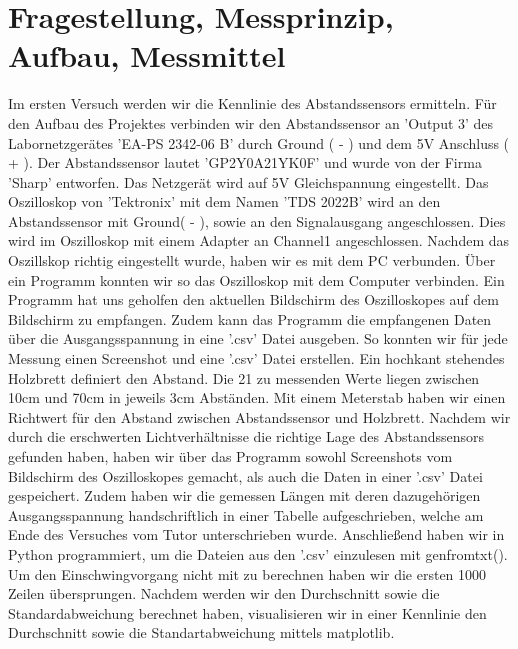 \documentclass[12pt, oneside, a4paper, \docLanguage]{report}
\begin{document}
\section{Fragestellung, Messprinzip, Aufbau, Messmittel}
\label{chap:VERSUCH_1_FRAGESTELLUNG}
Im ersten Versuch werden wir die Kennlinie des Abstandssensors ermitteln.  Für den Aufbau des Projektes verbinden wir den Abstandssensor an 'Output 3' des Labornetzgerätes 'EA-PS 2342-06 B' durch Ground ( - ) und dem 5V Anschluss ( + ).
Der Abstandssensor lautet 'GP2Y0A21YK0F' und wurde von der Firma 'Sharp' entworfen. Das Netzgerät wird auf 5V Gleichspannung eingestellt. Das Oszilloskop von 'Tektronix' mit dem Namen 'TDS 2022B' wird an den Abstandssensor mit Ground( - ), sowie an den Signalausgang angeschlossen.
Dies wird im Oszilloskop mit einem Adapter an Channel1 angeschlossen. Nachdem das Oszillskop richtig eingestellt wurde, haben wir es mit dem PC verbunden.
Über ein Programm konnten wir so das Oszilloskop mit dem Computer verbinden. Ein Programm hat uns geholfen den aktuellen Bildschirm des Oszilloskopes auf dem Bildschirm zu empfangen.
Zudem kann das Programm die empfangenen Daten über die Ausgangsspannung in eine '.csv' Datei ausgeben.
So konnten wir für jede Messung einen Screenshot und eine '.csv' Datei erstellen. 
Ein hochkant stehendes Holzbrett definiert den Abstand. Die 21 zu messenden Werte liegen zwischen 10cm und 70cm in jeweils  3cm Abständen. Mit einem Meterstab haben wir einen Richtwert für den Abstand zwischen Abstandssensor und Holzbrett. 
Nachdem wir durch die erschwerten Lichtverhältnisse die richtige Lage des Abstandssensors gefunden haben, haben wir über das Programm sowohl Screenshots vom Bildschirm des Oszilloskopes gemacht, als auch die Daten in einer '.csv' Datei gespeichert.
Zudem haben wir die gemessen Längen mit deren dazugehörigen Ausgangsspannung handschriftlich in einer Tabelle aufgeschrieben, welche am Ende des Versuches vom Tutor unterschrieben wurde.
Anschließend haben wir in Python programmiert, um die Dateien aus den '.csv' einzulesen mit genfromtxt(). Um den Einschwingvorgang nicht mit zu berechnen haben wir die ersten 1000 Zeilen übersprungen. 
Nachdem werden wir den Durchschnitt sowie die Standardabweichung berechnet haben, visualisieren wir in einer Kennlinie den Durchschnitt sowie die Standartabweichung mittels matplotlib.
\end{document}
